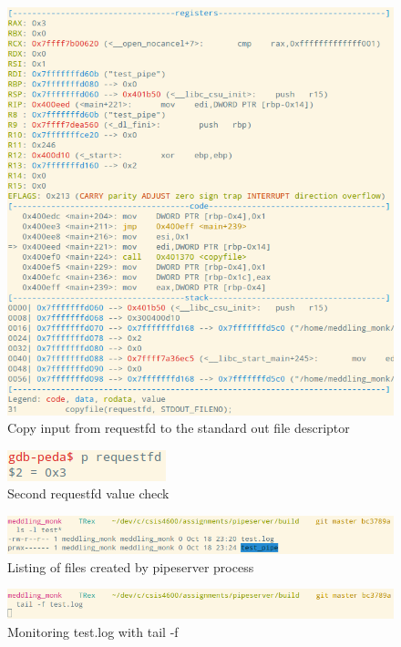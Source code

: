 \documentclass[letter,12pt,sffamily]{article}
\begin{document}
\begin{figure}[H]
	\centering
	\includegraphics[width=1\linewidth]{./images/6}
	\caption[copyfile]{Copy input from requestfd to the standard out file descriptor}
	\label{fig:6}
\end{figure}
\begin{figure}[H]
	\centering
	\includegraphics[width=0.3\linewidth]{./images/7}
	\caption[requestfd_val_check_2]{Second requestfd value check}
	\label{fig:7}
\end{figure}
\begin{figure}[H]
	\centering
	\includegraphics[width=1\linewidth]{./images/8}
	\caption[created_files_listing]{Listing of files created by pipeserver process}
	\label{fig:8}
\end{figure}
\begin{figure}[H]
	\centering
	\includegraphics[width=1\linewidth]{./images/9}
	\caption[tailf]{Monitoring test.log with tail -f}
	\label{fig:9}
\end{figure}
\end{document}
